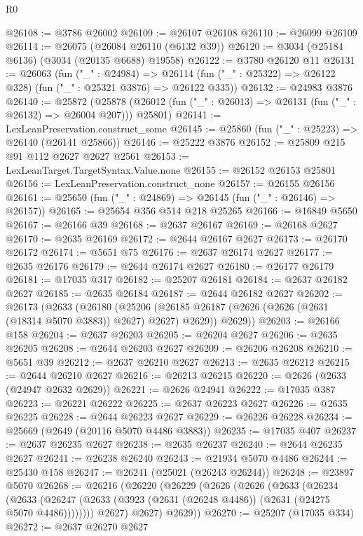 \begin{lexlean}{R0}
\begin{coremodule}
@26108 := @3786 @26002
@26109 := @26107 @26108
@26110 := @26099 @26109
@26114 := @26075 (@26084 @26110 (@6132 @39))
@26120 := @3034 (@25184 @6136) (@3034 (@20135 @6688) @19558)
@26122 := @3780 @26120 @11
@26131 := @26063
    (fun ("_" : @24984) =>
    @26114 (fun ("_" : @25322) => @26122 @328) (fun ("_" : @25321 @3876) => @26122 @335))
@26132 := @24983 @3876
@26140 := @25872
    (@25878 (@26012 (fun ("_" : @26013) => @26131 (fun ("_" : @26132) => @26004 @207))) @25801)
@26141 := LexLeanPreservation.construct_some
@26145 := @25860 (fun ("_" : @25223) => @26140 (@26141 @25866))
@26146 := @25222 @3876
@26152 := @25809 @215 @91 @112 @2627 @2627 @2561
@26153 := LexLeanTarget.TargetSyntax.Value.none
@26155 := @26152 @26153 @25801
@26156 := LexLeanPreservation.construct_none
@26157 := @26155 @26156
@26161 := @25650 (fun ("_" : @24869) => @26145 (fun ("_" : @26146) => @26157))
@26165 := @25654 @356 @514 @218 @25265
@26166 := @16849 @5650
@26167 := @26166 @39
@26168 := @2637 @26167
@26169 := @26168 @2627
@26170 := @2635 @26169
@26172 := @2644 @26167 @2627
@26173 := @26170 @26172
@26174 := @5651 @75
@26176 := @2637 @26174 @2627
@26177 := @2635 @26176
@26179 := @2644 @26174 @2627
@26180 := @26177 @26179
@26181 := @17035 @317
@26182 := @25207 @26181
@26184 := @2637 @26182 @2627
@26185 := @2635 @26184
@26187 := @2644 @26182 @2627
@26202 := @26173
    (@2633
      (@26180
        (@25206 (@26185 @26187 (@2626 (@2626 (@2631 (@18314 @5070 @3883)) @2627) @2627) @2629))
        @2629))
@26203 := @26166 @158
@26204 := @2637 @26203
@26205 := @26204 @2627
@26206 := @2635 @26205
@26208 := @2644 @26203 @2627
@26209 := @26206 @26208
@26210 := @5651 @39
@26212 := @2637 @26210 @2627
@26213 := @2635 @26212
@26215 := @2644 @26210 @2627
@26216 := @26213 @26215
@26220 := @2626 (@2633 (@24947 @2632 @2629))
@26221 := @2626 @24941
@26222 := @17035 @387
@26223 := @26221 @26222
@26225 := @2637 @26223 @2627
@26226 := @2635 @26225
@26228 := @2644 @26223 @2627
@26229 := @26226 @26228
@26234 := @25669 (@2649 (@20116 @5070 @4486 @3883))
@26235 := @17035 @407
@26237 := @2637 @26235 @2627
@26238 := @2635 @26237
@26240 := @2644 @26235 @2627
@26241 := @26238 @26240
@26243 := @21934 @5070 @4486
@26244 := @25430 @158
@26247 := @26241 (@25021 (@26243 @26244))
@26248 := @23897 @5070
@26268 := @26216
    (@26220
      (@26229
        (@2626
          (@2626
            (@2633
              (@26234
                (@2633
                  (@26247 (@2633 (@3923 (@2631 (@26248 @4486)) (@2631 (@24275 @5070 @4486))))))))
            @2627)
          @2627)
        @2629))
@26270 := @25207 (@17035 @334)
@26272 := @2637 @26270 @2627

\end{coremodule}
\end{lexlean}
